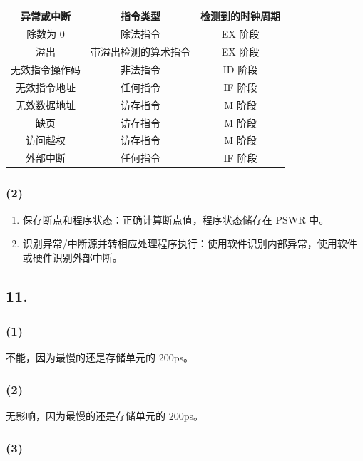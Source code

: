 \documentclass[12pt, a4paper]{ctexart}
\begin{document}
\begin{table}[H]
    \centering
    \begin{tabular}{|c|c|c|}
        \hline
        异常或中断 & 指令类型 & 检测到的时钟周期 \\ \hline
        除数为 0 & 除法指令 & EX 阶段 \\
        溢出 & 带溢出检测的算术指令 & EX 阶段 \\
        无效指令操作码 & 非法指令 & ID 阶段 \\
        无效指令地址 & 任何指令 & IF 阶段 \\
        无效数据地址 & 访存指令 & M 阶段 \\
        缺页 & 访存指令 & M 阶段 \\
        访问越权 & 访存指令 & M 阶段 \\
        外部中断 & 任何指令 & IF 阶段 \\ \hline
    \end{tabular}
\end{table}

\subsubsection*{(2)}

\begin{enumerate}
    \item 保存断点和程序状态：正确计算断点值，程序状态储存在 PSWR 中。
    \item 识别异常/中断源并转相应处理程序执行：使用软件识别内部异常，使用软件或硬件识别外部中断。
\end{enumerate}

\subsection*{11.}

\subsubsection*{(1)}

不能，因为最慢的还是存储单元的 200ps。

\subsubsection*{(2)}

无影响，因为最慢的还是存储单元的 200ps。

\subsubsection*{(3)}
\end{document}
